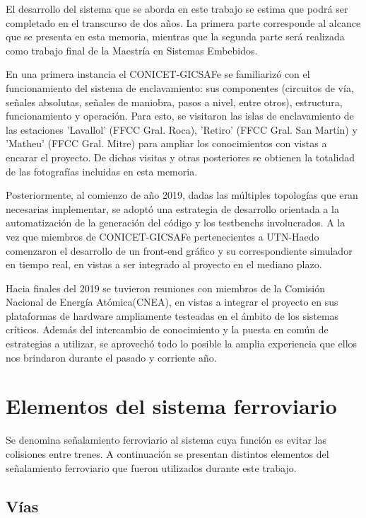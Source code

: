 		El desarrollo del sistema que se aborda en este trabajo se estima que podrá ser completado en el transcurso de dos años. La primera parte corresponde al alcance que se presenta en esta memoria, mientras que la segunda parte será realizada como trabajo final de la Maestría en Sistemas Embebidos.	
	
		En una primera instancia el CONICET-GICSAFe se familiarizó con el funcionamiento del sistema de enclavamiento: sus componentes (circuitos de vía, señales absolutas, señales de maniobra, pasos a nivel, entre otros), estructura, funcionamiento y operación. Para esto, se visitaron las islas de enclavamiento de las estaciones 'Lavallol' (FFCC Gral. Roca), 'Retiro' (FFCC Gral. San Martín) y 'Matheu' (FFCC Gral. Mitre) para ampliar los conocimientos con vistas a encarar el proyecto. De dichas visitas y otras posteriores se obtienen la totalidad de las fotografías incluidas en esta memoria.
	
		Posteriormente, al comienzo de año 2019, dadas las múltiples topologías que eran necesarias implementar, se adoptó una estrategia de desarrollo orientada a la automatización de la generación del código y los testbenchs involucrados. A la vez que miembros de CONICET-GICSAFe pertenecientes a UTN-Haedo comenzaron el desarrollo de un front-end gráfico y su correspondiente simulador en tiempo real, en vistas a ser integrado al proyecto en el mediano plazo.
	
		Hacia finales del 2019 se tuvieron reuniones con miembros de la Comisión Nacional de Energía Atómica(CNEA), en vistas a integrar el proyecto en sus plataformas de hardware ampliamente testeadas en el ámbito de los sistemas críticos. Además del intercambio de conocimiento y la puesta en común de estrategias a utilizar, se aprovechó todo lo posible la amplia experiencia que ellos nos brindaron durante el pasado y corriente año.	 
		
	\section{Elementos del sistema ferroviario}
	
		Se denomina señalamiento ferroviario al sistema cuya función es evitar las colisiones entre trenes. A continuación se presentan distintos elementos del señalamiento ferroviario que fueron utilizados durante este trabajo.
		
		\subsection{Vías}
			
